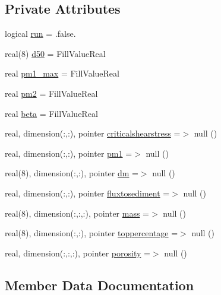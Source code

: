 \subsection*{Private Attributes}
\begin{DoxyCompactItemize}
\item 
logical \mbox{\hyperlink{structmodulesediment_1_1t__cohesive_aed2c22a917da91093489c8d965679630}{run}} = .false.
\item 
real(8) \mbox{\hyperlink{structmodulesediment_1_1t__cohesive_a5979599ac7adec5db4d99970e3a6d2c4}{d50}} = Fill\+Value\+Real
\item 
real \mbox{\hyperlink{structmodulesediment_1_1t__cohesive_abc2d4edf095fe83e797b5926bf912443}{pm1\+\_\+max}} = Fill\+Value\+Real
\item 
real \mbox{\hyperlink{structmodulesediment_1_1t__cohesive_a6ca4c62ef6a4d9bb7565413fc39d45ec}{pm2}} = Fill\+Value\+Real
\item 
real \mbox{\hyperlink{structmodulesediment_1_1t__cohesive_a92408c236584753525d39eeabf10edb8}{beta}} = Fill\+Value\+Real
\item 
real, dimension(\+:,\+:), pointer \mbox{\hyperlink{structmodulesediment_1_1t__cohesive_a8e14aed7ea65eab79c6bb8e4c4d20c3d}{criticalshearstress}} =$>$ null ()
\item 
real, dimension(\+:,\+:), pointer \mbox{\hyperlink{structmodulesediment_1_1t__cohesive_a97f2ad2fa00640a26dcb5647b0c5974c}{pm1}} =$>$ null ()
\item 
real(8), dimension(\+:,\+:), pointer \mbox{\hyperlink{structmodulesediment_1_1t__cohesive_afb834247c2280776fbd4c52461e631bd}{dm}} =$>$ null ()
\item 
real, dimension(\+:,\+:), pointer \mbox{\hyperlink{structmodulesediment_1_1t__cohesive_a3d5b76c2316de54276dbe1a6d0986f49}{fluxtosediment}} =$>$ null ()
\item 
real(8), dimension(\+:,\+:,\+:), pointer \mbox{\hyperlink{structmodulesediment_1_1t__cohesive_a2b2a3df084a2e9634f4b29a0679a1b6c}{mass}} =$>$ null ()
\item 
real(8), dimension(\+:,\+:), pointer \mbox{\hyperlink{structmodulesediment_1_1t__cohesive_a83a66c3fb9055f974736f99240a621f0}{toppercentage}} =$>$ null ()
\item 
real, dimension(\+:,\+:,\+:), pointer \mbox{\hyperlink{structmodulesediment_1_1t__cohesive_a7b7e545f96a6d54e8f5c75777a556546}{porosity}} =$>$ null ()
\end{DoxyCompactItemize}


\subsection{Member Data Documentation}
\mbox{\label{structmodulesediment_1_1t__cohesive_a92408c236584753525d39eeabf10edb8}} 
